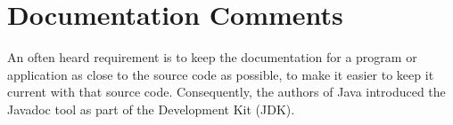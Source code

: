 \chapter{Documentation Comments}\label{sec:DocumentationComments}
An often heard requirement is to keep the documentation for a program or application as close to the source code as possible, to make it easier to keep it current with that source code. Consequently, the authors of Java introduced the Javadoc tool as part of the \Java Development Kit (JDK).











